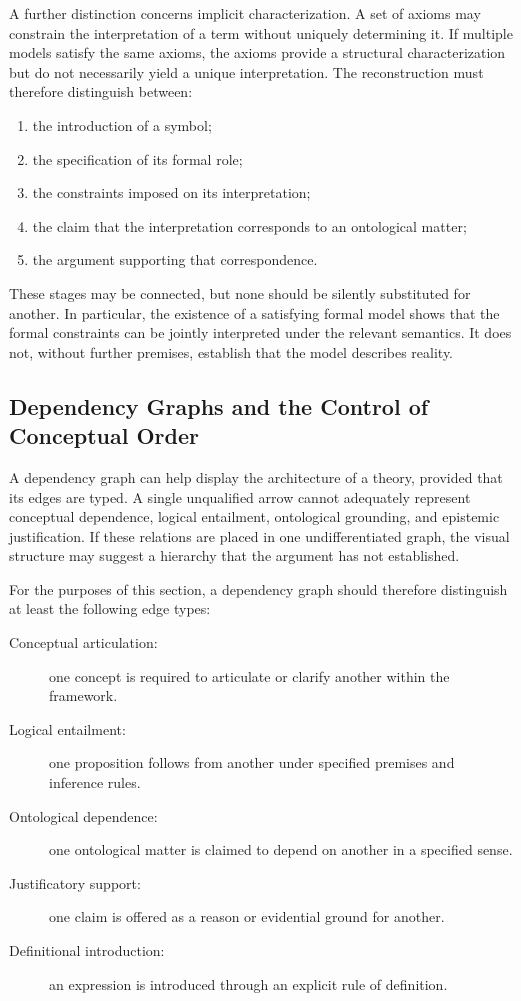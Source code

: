 A further distinction concerns implicit characterization. A set
of axioms may constrain the interpretation of a term without
uniquely determining it. If multiple models satisfy the same
axioms, the axioms provide a structural characterization but do
not necessarily yield a unique interpretation. The reconstruction
must therefore distinguish between:

\begin{enumerate}
  \item the introduction of a symbol;
  \item the specification of its formal role;
  \item the constraints imposed on its interpretation;
  \item the claim that the interpretation corresponds to an
  ontological matter;
  \item the argument supporting that correspondence.
\end{enumerate}

These stages may be connected, but none should be silently
substituted for another. In particular, the existence of a
satisfying formal model shows that the formal constraints can be
jointly interpreted under the relevant semantics. It does not,
without further premises, establish that the model describes
reality.

\subsection{Dependency Graphs and the Control of Conceptual Order}

A dependency graph can help display the architecture of a theory,
provided that its edges are typed. A single unqualified arrow
cannot adequately represent conceptual dependence, logical
entailment, ontological grounding, and epistemic justification.
If these relations are placed in one undifferentiated graph, the
visual structure may suggest a hierarchy that the argument has
not established.

For the purposes of this section, a dependency graph should
therefore distinguish at least the following edge types:

\begin{description}
  \item[Conceptual articulation:] one concept is required to
  articulate or clarify another within the framework.
  \item[Logical entailment:] one proposition follows from another
  under specified premises and inference rules.
  \item[Ontological dependence:] one ontological matter is claimed
  to depend on another in a specified sense.
  \item[Justificatory support:] one claim is offered as a reason
  or evidential ground for another.
  \item[Definitional introduction:] an expression is introduced
  through an explicit rule of definition.
\end{description}

